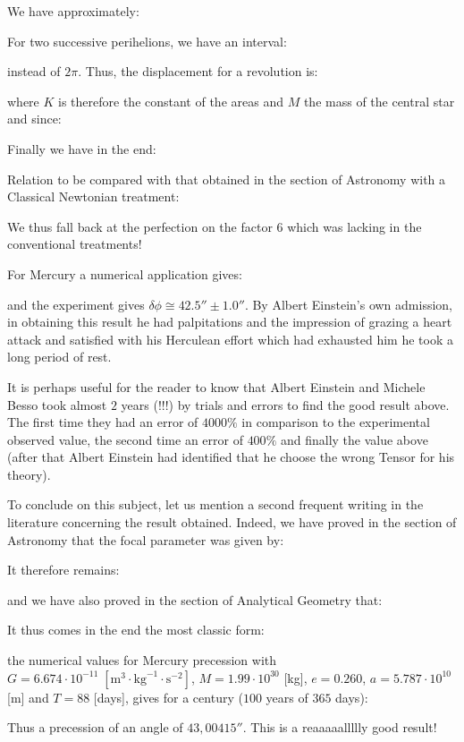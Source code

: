 	We have approximately:
	
	For two successive perihelions, we have an interval:
	
	instead of $2\pi$. Thus, the displacement for a revolution is:
	
	where $K$ is therefore the constant of the areas and $M$ the mass of the central star and since:
	
	Finally we have in the end:
	
	Relation to be compared with that obtained in the section of Astronomy with a Classical Newtonian treatment:
	
	We thus fall back at the perfection on the factor $6$ which was lacking in the conventional treatments!

	For Mercury a numerical application gives:
	
	and the experiment gives $\delta\phi\cong 42.5''\pm 1.0''$. By Albert Einstein's own admission, in obtaining this result he had palpitations and the impression of grazing a heart attack and satisfied with his Herculean effort which had exhausted him he took a long period of rest.
	\begin{tcolorbox}[title=Remark,colframe=black,arc=10pt]
	It is perhaps useful for the reader to know that Albert Einstein and Michele Besso took almost $2$ years (!!!) by trials and errors to find the good result above. The first time they had an error of $4000\%$ in comparison to the experimental observed value, the second time an error of $400\%$ and finally the value above (after that Albert Einstein had identified that he choose the wrong Tensor for his theory).
	\end{tcolorbox}
	To conclude on this subject, let us mention a second frequent writing in the literature concerning the result obtained. Indeed, we have proved in the section of Astronomy that the focal parameter was given by:
	
	It therefore remains:
	
	and we have also proved in the section of Analytical Geometry that:
	
	It thus comes in the end the most classic form:
	
	 the numerical values for Mercury precession with $G=6.674\cdot 10^{-11}\;[\text{m}^3\cdot\text{kg}^{-1}\cdot \text{s}^{-2} ]$, $M=1.99\cdot 10^{30}$ [kg], $e=0.260$, $a=5.787\cdot 10^{10}$ [m] and $T=88$ [days], gives for a century ($100$ years of $365$ days):
	
	Thus a precession of an angle of $43,00415''$. This is a reaaaaallllly good result!
	
